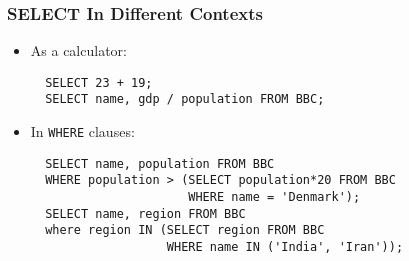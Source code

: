 \documentclass[dvipsnames]{beamer}
\begin{document}




 


\begin{frame}[fragile] 
\frametitle{SELECT In Different Contexts}
  \begin{itemize}[<+->]
  \item As a calculator:
    \begin{small}
\begin{verbatim}
  SELECT 23 + 19;
  SELECT name, gdp / population FROM BBC;
\end{verbatim}
    \end{small}
  \item In \texttt{WHERE} clauses:
    \begin{small}
\begin{verbatim}
  SELECT name, population FROM BBC
  WHERE population > (SELECT population*20 FROM BBC 
                      WHERE name = 'Denmark');
  SELECT name, region FROM BBC
  where region IN (SELECT region FROM BBC 
                   WHERE name IN ('India', 'Iran'));
\end{verbatim}
    \end{small}
  \end{itemize}
\end{frame}
\end{document}
